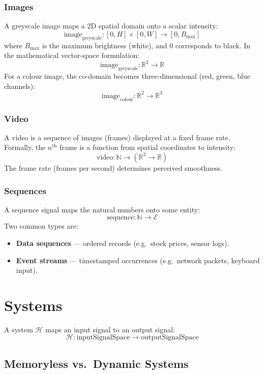 \documentclass[11pt]{article}
\begin{document}
\subsubsection{Images}
A greyscale image maps a 2D spatial domain onto a scalar intensity:
\[
  \text{image}_\text{greyscale} : [0, H] \times [0, W] \rightarrow [0, B_{\max}]
\]
where $B_{\max}$ is the maximum brightness (white), and $0$ corresponds to black. In the mathematical vector-space formulation:
\[
  \text{image}_\text{greyscale} : \mathbb{R}^2 \rightarrow \mathbb{R}
\]
For a colour image, the co-domain becomes three-dimensional (red, green, blue channels):
\[
  \text{image}_\text{colour} : \mathbb{R}^2 \rightarrow \mathbb{R}^3
\]

\subsubsection{Video}
A video is a sequence of images (frames) displayed at a fixed frame rate. Formally, the $n^{\text{th}}$ frame is a function from spatial coordinates to intensity:
\[
  \text{video} : \mathbb{N} \rightarrow \left(\mathbb{R}^2 \rightarrow \mathbb{R}\right)
\]
The frame rate (frames per second) determines perceived smoothness.

\subsubsection{Sequences}
A sequence signal maps the natural numbers onto some entity:
\[
  \text{sequence} : \mathbb{N} \rightarrow \mathcal{E}
\]
Two common types are:
\begin{itemize}
  \item \textbf{Data sequences} — ordered records (e.g.\ stock prices, sensor logs).
  \item \textbf{Event streams} — timestamped occurrences (e.g.\ network packets, keyboard input).
\end{itemize}

 
\section{Systems}

A system $\mathcal{H}$ maps an input signal to an output signal:
\[
  \mathcal{H} : \text{inputSignalSpace} \rightarrow \text{outputSignalSpace}
\]

\subsection{Memoryless vs.\ Dynamic Systems}
\end{document}
